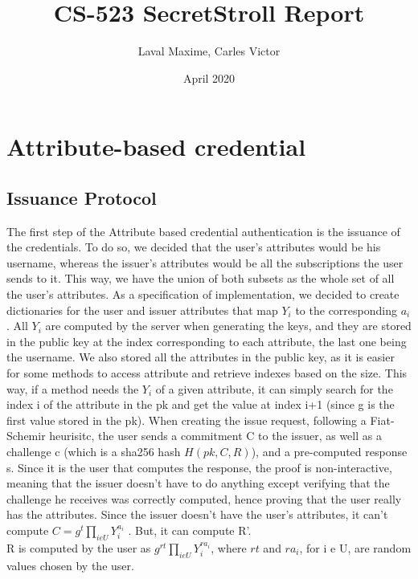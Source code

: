 \documentclass[10pt,conference,compsocconf]{IEEEtran}
\title{CS-523 SecretStroll Report}
\author{Laval Maxime, Carles Victor}
\date{April 2020}
\begin{document}
\maketitle

\section{Attribute-based credential}

\subsection{Issuance Protocol}

The first step of the Attribute based credential authentication is the issuance of the credentials. To do so, we decided that the user's attributes would be his username, whereas the issuer's attributes would be all the subscriptions the user sends to it. This way, we have the union of both subsets as the whole set of all the user's attributes. As a specification of implementation, we decided to create dictionaries for the user and issuer attributes that map $Y_{i}$ to the corresponding $a_{i}$. All $Y_{i}$ are computed by the server when generating the keys, and they are stored in the public key at the index corresponding to each attribute, the last one being the username. We also stored all the attributes in the public key, as it is easier for some methods to access attribute and retrieve indexes based on the size. 
This way, if a method needs the $Y_{i}$ of a given attribute, it can simply search for the index i of the attribute in the pk and get the value at index i+1 (since g is the first value stored in the pk).
When creating the issue request, following a Fiat-Schemir heurisitc, the user sends a commitment C to the issuer, as well as a challenge c (which is a sha256 hash $H(pk,C,R)$), and a pre-computed response s. Since it is the user that computes the response, the proof is non-interactive, meaning that the issuer doesn't have to do anything except verifying that the challenge he receives was correctly computed, hence proving that the user really has the attributes. Since the issuer doesn't have the user's attributes, it can't compute $C = g^t \prod_{i e U}{Y_{i}^{a_{i}}}$ . 
But, it can compute R'. 
\\	
\hspace{1cm}
R is computed by the user as $g^{rt} \prod_{i e U}{Y_{i}^{ra_{i}}}$, where $rt$ and $ra_{i}$, for i e U, are random values chosen by the user. 
\\	
\hspace{1cm}
\end{document}
